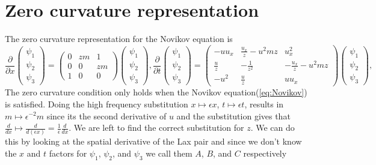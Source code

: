 \documentclass[english,master]{liumaiex}
\theoremstyle{plain}
\theoremstyle{definition}
\begin{document}
\section{Zero curvature representation}

The zero curvature representation for the Novikov equation \cite{Lundmark_2022} is
\begin{subequations}
  \label{eq:Novikov-lax}
  \begin{equation}
    \label{eq:Novikov-lax-x}
    \frac{\partial}{\partial x}
    \begin{pmatrix} \psi_1 \\ \psi_2 \\ \psi_3 \end{pmatrix} =
    \begin{pmatrix}
      0 & zm & 1 \\
      0 & 0 & zm \\
      1 & 0 & 0
    \end{pmatrix}
    \begin{pmatrix} \psi_1 \\ \psi_2 \\ \psi_3 \end{pmatrix}
    ,
  \end{equation}
  \begin{equation}
    \label{eq:Novikov-lax-t}
    \frac{\partial}{\partial t}
    \begin{pmatrix} \psi_1 \\ \psi_2 \\ \psi_3 \end{pmatrix} =
    \begin{pmatrix}
      -u u_x & \frac{u_x}{z}-u^2 mz & u_x^2 \\
      \frac{u}{z} & - \frac{1}{z^2} & - \frac{u_x}{z} - u^2 mz \\
      -u^2 & \frac{u}{z} & uu_x
    \end{pmatrix}
    \begin{pmatrix} \psi_1 \\ \psi_2 \\ \psi_3 \end{pmatrix}
    ,
  \end{equation}
\end{subequations}
%
The zero curvature condition only holds when the Novikov equation(\ref{eq:Novikov}) is satisfied.
Doing the high frequency substitution $x \mapsto \epsilon x$, $t \mapsto \epsilon t$, results in $m \mapsto \epsilon^{-2} m$ since its the second derivative of $u$ and the substitution gives that $\frac{d}{dx} \mapsto \frac{d}{d (\epsilon x)} = \frac{1}{\epsilon} \frac{d}{dx}$. We are left to find the correct substitution for $z$. We can do this by looking at the spatial derivative of the Lax pair and since we don't know the $x$ and $t$ factors for $\psi_1$, $\psi_2$, and $\psi_3$ we call them $A$, $B$, and $C$ respectively
\end{document}
